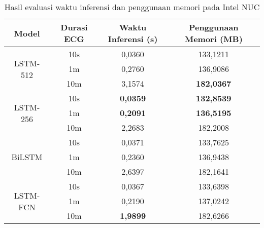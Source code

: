 \begin{table}[H]
\centering
\caption{Hasil evaluasi waktu inferensi dan penggunaan memori pada Intel NUC}
\label{tab:intelnuc}
\begin{tabular}{|c|c|c|c|}
\hline
\textbf{Model} & \textbf{Durasi ECG} & \textbf{Waktu Inferensi (s)} & \textbf{Penggunaan Memori (MB)} \\ \hline
\multirow{3}{*}{ LSTM-512 }       & 10s                 & 0,0360                      & 133,1211                   \\ 
              \cline{2-4}
               & 1m                  & 0,2760                      & 136,9086                   \\ 
              \cline{2-4}
               & 10m                 & 3,1574                      & \textbf{182,0367}                   \\ \hline
\multirow{3}{*}{ LSTM-256 }       & 10s                 & \textbf{0,0359}                      & \textbf{132,8539}                   \\
              \cline{2-4}
               & 1m                  & \textbf{0,2091}                      & \textbf{136,5195}                   \\ 
              \cline{2-4}
               & 10m                 & 2,2683                      & 182,2008                   \\ \hline
\multirow{3}{*}{ BiLSTM }         & 10s                 & 0,0371                      & 133,7625                   \\
              \cline{2-4}
               & 1m                  & 0,2360                      & 136,9438                   \\ 
              \cline{2-4}
               & 10m                 & 2,6397                      & 182,1641                   \\ \hline
\multirow{3}{*}{ LSTM-FCN }       & 10s                 & 0,0367                      & 133,6398                   \\
              \cline{2-4}
               & 1m                  & 0,2190                      & 137,0242                   \\
              \cline{2-4}
               & 10m                 & \textbf{1,9899}                      & 182,6266                   \\ \hline
\end{tabular}
\end{table}

